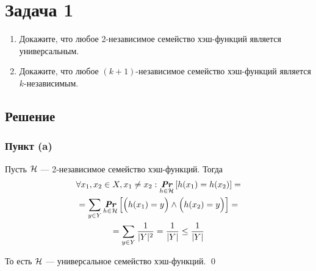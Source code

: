 \section{Задача 1}
\begin{enumerate}[label=(\alph*)]
\item Докажите, что любое 2-независимое семейство хэш-функций является универсальным.
\item Докажите, что любое $(k+1)$-независимое семейство хэш-функций является $k$-независимым.
\end{enumerate}

\subsection{Решение}
\subsubsection{Пункт (a)}
Пусть $\mathcal{H}$ --- 2-независимое семейство хэш-функций. Тогда
\begin{gather*}
    \forall x_1, x_2 \in X, x_1 \neq x_2 : \underset{h \in \mathcal{H}}{\textit{\textbf{Pr}}} \left[ h(x_1) = h(x_2) \right] = \\
    = \sum_{y \in Y} \underset{h \in \mathcal{H}}{\textit{\textbf{Pr}}} \left[ \Bigl( h(x_1) = y \Bigr) \land \Bigl( h(x_2) = y \Bigr) \right] = \\
    = \sum_{y \in Y} \frac{1}{|Y|^2} = \frac{1}{|Y|} \leq \frac{1}{|Y|}
\end{gather*}

То есть $\mathcal{H}$ --- универсальное семейство хэш-функций.
\qed

